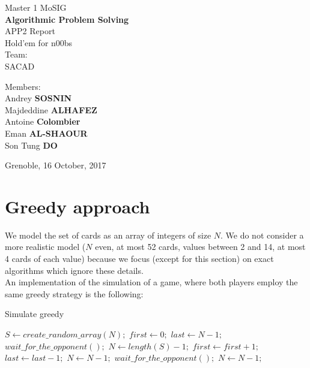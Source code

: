 \documentclass{article}
\begin{document}
\begin{titlepage}
\begin{center}

\vspace*{5cm}
{\large Master 1 MoSIG}\\[0.5cm]

{\Huge \textbf{Algorithmic Problem Solving} }\\[0.5cm]
{\large APP2 Report} \\
Hold'em for n00bs\\ 
Team:\\SACAD
\vfill

\noindent
\begin{minipage}{0.4\textwidth}

   \centering Members:\\Andrey \textbf{SOSNIN}\\Majdeddine \textbf{ALHAFEZ}\\Antoine \textbf{Colombier}\\Eman \textbf{AL-SHAOUR}\\Son Tung \textbf{DO}\\

\end{minipage}%

\vfill
{Grenoble, 16 October, 2017}
\clearpage

\tableofcontents

\end{center}
\end{titlepage}
\section{Greedy approach}
We model the set of cards as an array of integers of size $N$. We do not consider a more realistic model ($N$ even, at most 52 cards, values between 2 and 14, at most 4 cards of each value) because we focus (except for this section) on exact algorithms which ignore these details.\\
An implementation of the simulation of a game, where both players employ the same greedy strategy is the following:

\begin{algorithm}[H]
\caption{Simulate greedy}
\begin{algorithmic} 
\State $S \leftarrow create\_random\_array(N);$
\State $first \leftarrow 0;$
\State $last \leftarrow N - 1;$
\State $wait\_for\_the\_opponent();$
\State $N \leftarrow length(S) - 1;$
        \State $first \leftarrow first + 1;$
    \Else
        \State $last \leftarrow last - 1;$
    \EndIf
    \State $N \leftarrow N - 1;$
        \State $wait\_for\_the\_opponent();$
        \State $N \leftarrow N - 1;$
    \EndIf
\EndWhile
\end{algorithmic}
\end{algorithm}
\end{document}
